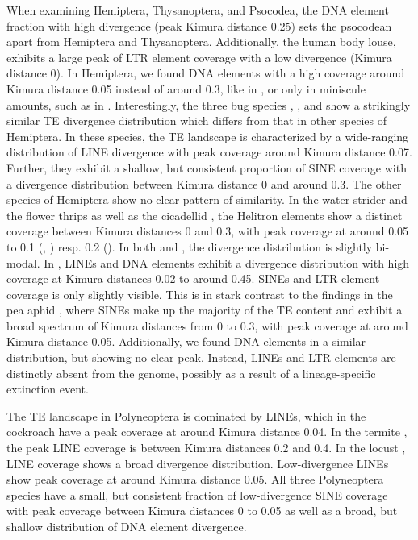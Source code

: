 When examining Hemiptera, Thysanoptera, and Psocodea, the DNA element
fraction with high divergence (peak Kimura distance 0.25) sets the
psocodean  apart from Hemiptera and Thysanoptera.
Additionally, the human body louse,  exhibits a
large peak of LTR element coverage with a low divergence (Kimura
distance 0).  In Hemiptera, we found DNA elements with a high coverage
around Kimura distance 0.05 instead of around 0.3, like in , or only in miniscule amounts, such as in .  Interestingly, the three bug species ,
, and  show a
strikingly similar TE divergence distribution which differs from that in
other species of Hemiptera. In these species, the TE landscape is
characterized by a wide-ranging distribution of LINE divergence with
peak coverage around Kimura distance 0.07. Further, they exhibit a
shallow, but consistent proportion of SINE coverage with a divergence
distribution between Kimura distance 0 and around 0.3. The other species
of Hemiptera show no clear pattern of similarity. In the water strider
 and the flower thrips  as well as the cicadellid , the Helitron elements show a distinct coverage between
Kimura distances 0 and 0.3, with peak coverage at around 0.05 to 0.1
(, ) resp.  0.2 (). In both  and , the divergence distribution is slightly bi-modal. In
, LINEs and DNA elements exhibit a divergence
distribution with high coverage at Kimura distances 0.02 to around 0.45.
SINEs and LTR element coverage is only slightly visible. This is in
stark contrast to the findings in the pea aphid , where SINEs make up the majority of the TE content and exhibit a
broad spectrum of Kimura distances from 0 to 0.3, with peak coverage at
around Kimura distance 0.05. Additionally, we found DNA elements in a
similar distribution, but showing no clear peak. Instead, LINEs and LTR
elements are distinctly absent from the  genome,
possibly as a result of a lineage-specific extinction event.

The TE landscape in Polyneoptera is dominated by LINEs, which in the
cockroach  have a peak coverage at around
Kimura distance 0.04. In the termite ,
the peak LINE coverage is between Kimura distances 0.2 and 0.4. In the
locust , LINE coverage shows a broad divergence
distribution. Low-divergence LINEs show peak coverage at around Kimura
distance 0.05. All three Polyneoptera species have a small, but
consistent fraction of low-divergence SINE coverage with peak coverage
between Kimura distances 0 to 0.05 as well as a broad, but shallow
distribution of DNA element divergence.




